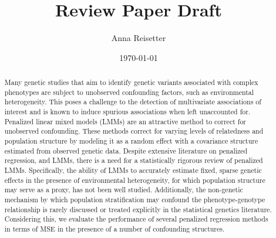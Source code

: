 \documentclass[a4paper]{article}
\title{Review Paper Draft}
\author{Anna Reisetter}
\date{\today}
\begin{document}
\maketitle

\begin{abstract}
Many genetic studies that aim to identify genetic variants associated with complex phenotypes are subject to unobserved confounding factors, such as environmental heterogeneity. This poses a challenge to the detection of multivariate associations of interest and is known to induce spurious associations when left unaccounted for. Penalized linear mixed models (LMMs) are an attractive method to correct for unobserved confounding. These methods correct for varying levels of relatedness and population structure by modeling it as a random effect with a covariance structure estimated from observed genetic data. Despite extensive literature on penalized regression, and LMMs, there is a need for a statistically rigorous review of penalized LMMs. Specifically, the ability of LMMs to accurately estimate fixed, sparse genetic effects in the presence of environmental heterogeneity, for which population structure may serve as a proxy, has not been well studied. Additionally, the non-genetic mechanism by which population stratification may confound the phenotype-genotype relationship is rarely discussed or treated explicitly in the statistical genetics literature. Considering this, we evaluate the performance of several penalized regression methods in terms of MSE in the presence of a number of confounding structures.
\end{abstract}



\newpage



\end{document}
